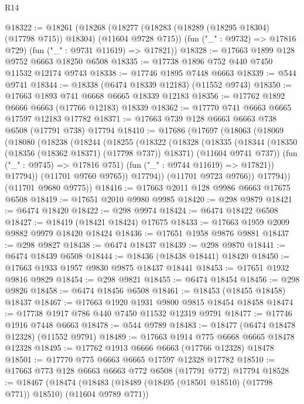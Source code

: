 \begin{lexlean}{R14}
\begin{coremodule}
{{{{{{{{{{{{{{{{{{{{{{{{{{{{{{{{{{{{{{{{{{{{{{{{{{{{{{{{{{{{{{{{{{{{{{{{{{{{{{{{{{@18322 := @18261
    (@18268
      (@18277 (@18283 (@18289 (@18295 @18304) (@17798 @715)) @18304) (@11604 @9728 @715))
      (fun ("_" : @9732) => @17816 @729)
      (fun ("_" : @9731 @11619) => @17821))
@18328 := @17663 @1899 @128 @9752 @6663 @18250 @6508
@18335 := @17738 @1896 @752 @440 @7450 @11532 @12174 @9743
@18338 := @17746 @1895 @7448 @6663
@18339 := @544 @9741
@18344 := @18338 (@6474 @18339 @12183) (@11552 @9743)
@18350 := @17663 @1893 @741 @6668 @6665 @18339 @12183
@18356 := @17762 @1892 @6666 @6663 (@17766 @12183) @18339
@18362 := @17770 @741 @6663 @6665 @17597 @12183 @17782
@18371 := @17663 @739 @128 @6663 @6663 @738 @6508 (@17791 @738) @17794
@18410 := @17686
    (@17697
      (@18063
        (@18069
          (@18080
            (@18238
              (@18244
                (@18255
                  (@18322
                    (@18328
                      (@18335
                        (@18344
                          (@18350 (@18356 (@18362 @18371) (@17798 @737)) @18371)
                          (@11604 @9741 @737))
                        (fun ("_" : @9745) => @17816 @751)
                        (fun ("_" : @9744 @11619) => @17821))
                      @17794))
                  (@11701 @9760 @9765))
                @17794))
            (@11701 @9723 @9766))
          @17794))
      (@11701 @9680 @9775))
@18416 := @17663 @2011 @128 @9986 @6663 @17675 @6508
@18419 := @17651 @2010 @9980 @9985
@18420 := @298 @9879
@18421 := @6474 @18420
@18422 := @298 @9974
@18424 := @6474 @18422 @6508
@18427 := @18419 (@18421 @18424) @17675
@18433 := @17663 @1959 @2009 @9882 @9979 @18420 @18424
@18436 := @17651 @1958 @9876 @9881
@18437 := @298 @9827
@18438 := @6474 @18437
@18439 := @298 @9870
@18441 := @6474 @18439 @6508
@18444 := @18436 (@18438 @18441) @18420
@18450 := @17663 @1933 @1957 @9830 @9875 @18437 @18441
@18453 := @17651 @1932 @9816 @9829
@18454 := @298 @9821
@18455 := @6474 @18454
@18456 := @298 @9826
@18458 := @6474 @18456 @6508
@18461 := @18453 (@18455 @18458) @18437
@18467 := @17663 @1920 @1931 @9800 @9815 @18454 @18458
@18474 := @17738 @1917 @786 @440 @7450 @11532 @12319 @9791
@18477 := @17746 @1916 @7448 @6663
@18478 := @544 @9789
@18483 := @18477 (@6474 @18478 @12328) (@11552 @9791)
@18489 := @17663 @1914 @775 @6668 @6665 @18478 @12328
@18495 := @17762 @1913 @6666 @6663 (@17766 @12328) @18478
@18501 := @17770 @775 @6663 @6665 @17597 @12328 @17782
@18510 := @17663 @773 @128 @6663 @6663 @772 @6508 (@17791 @772) @17794
@18528 := @18467
    (@18474
      (@18483 (@18489 (@18495 (@18501 @18510) (@17798 @771)) @18510) (@11604 @9789 @771))
}}}}}}}}}}}}}}}}}}}}}}}}}}}}}}}}}}}}}}}}}}}}}}}}}}}}}}}}}}}}}}}}}}}}}}}}}}}}}}}}}}
\end{coremodule}
\end{lexlean}
